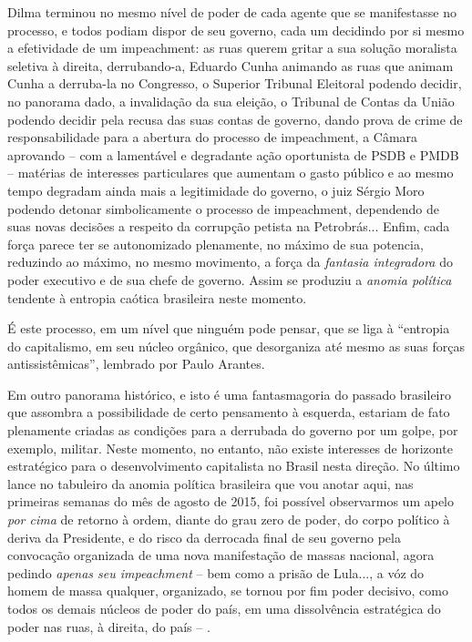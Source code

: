 Dilma terminou no mesmo nível de poder de cada agente que se
manifestasse no processo, e todos podiam dispor de seu governo, cada um
decidindo por si mesmo a efetividade de um impeachment: as ruas querem
gritar a sua solução moralista seletiva à direita, derrubando-a, Eduardo
Cunha animando as ruas que animam Cunha a derruba-la no Congresso, o
Superior Tribunal Eleitoral podendo decidir, no panorama dado, a
invalidação da sua eleição, o Tribunal de Contas da União podendo
decidir pela recusa das suas contas de governo, dando prova de crime de
responsabilidade para a abertura do processo de impeachment, a Câmara
aprovando -- com a lamentável e degradante ação oportunista de PSDB e
PMDB -- matérias de interesses particulares que aumentam o gasto público
e ao mesmo tempo degradam ainda mais a legitimidade do governo, o juiz
Sérgio Moro podendo detonar simbolicamente o processo de impeachment,
dependendo de suas novas decisões a respeito da corrupção petista na
Petrobrás... Enfim, cada força parece ter se autonomizado plenamente, no
máximo de sua potencia, reduzindo ao máximo, no mesmo movimento, a força
da \emph{fantasia integradora} do poder executivo e de sua chefe de
governo. Assim se produziu a \emph{anomia política} tendente à entropia
caótica brasileira neste momento.

É este processo, em um nível que ninguém pode pensar, que se liga à
``entropia do capitalismo, em seu núcleo orgânico, que desorganiza até
mesmo as suas forças antissistêmicas'', lembrado por Paulo Arantes.

Em outro panorama histórico, e isto é uma fantasmagoria do passado
brasileiro que assombra a possibilidade de certo pensamento à esquerda,
estariam de fato plenamente criadas as condições para a derrubada do
governo por um golpe, por exemplo, militar. Neste momento, no entanto,
não existe interesses de horizonte estratégico para o desenvolvimento
capitalista no Brasil nesta direção. No último lance no tabuleiro da
anomia política brasileira que vou anotar aqui, nas primeiras semanas do
mês de agosto de 2015, foi possível observarmos um apelo \emph{por cima}
de retorno à ordem, diante do grau zero de poder, do corpo político à
deriva da Presidente, e do risco da derrocada final de seu governo pela
convocação organizada de uma nova manifestação de massas nacional, agora
pedindo \emph{apenas seu impeachment} -- bem como a prisão de Lula..., a
vóz do homem de massa qualquer, organizado, se tornou por fim poder
decisivo, como todos os demais núcleos de poder do país, em uma
dissolvência estratégica do poder nas ruas, à direita, do país -- .

